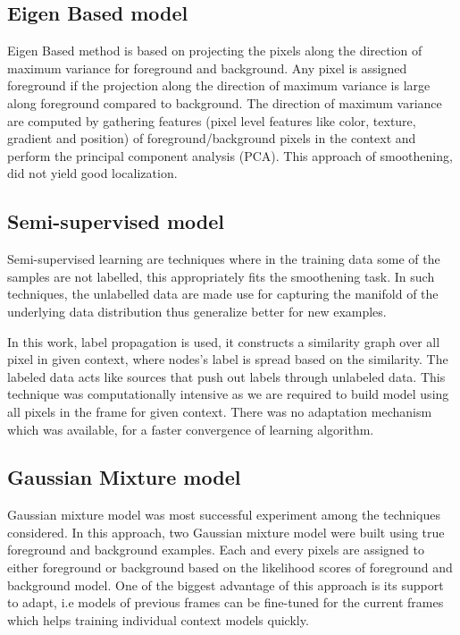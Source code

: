 \subsection{Eigen Based model}
Eigen Based method is based on projecting the pixels along the direction of maximum variance for foreground and background.  Any pixel is assigned foreground if the projection along the direction of maximum variance is large along foreground compared to background.  The direction of maximum variance are computed by gathering features (pixel level features like color, texture, gradient and position) of foreground/background pixels in the context and perform the principal component analysis (PCA).  This approach of smoothening, did not yield good localization.

\subsection{Semi-supervised model}
Semi-supervised learning are techniques where in the training data some of the samples are not labelled, this appropriately fits the smoothening task.  In such techniques, the unlabelled data are made use for capturing the manifold of the underlying data distribution thus generalize better for new examples. 
\par In this work, label propagation is used, it constructs a similarity graph over all pixel in given context, where nodes's label is spread based on the similarity.   The labeled data acts like sources that push out labels through unlabeled data.  This technique was computationally intensive as we are required to build model using all pixels in the frame for given context.  There was no adaptation mechanism which was available, for a faster convergence of learning algorithm.

\subsection{Gaussian Mixture model}
Gaussian mixture model was  most successful experiment among the techniques considered.  In this approach, two Gaussian mixture model were built using true foreground and background examples. Each and every pixels are assigned to either foreground or background based on the likelihood scores of foreground and background model.  One of the biggest advantage of this approach is its support to adapt, i.e models of previous frames can be fine-tuned for the current frames which helps training individual context models quickly.

